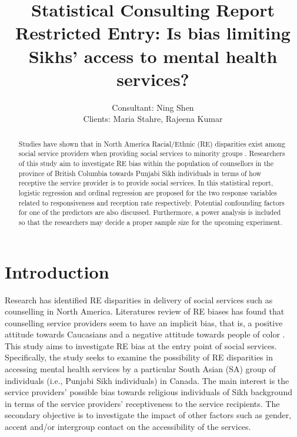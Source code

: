 \documentclass[11pt]{article}
\title{\textbf{Statistical Consulting Report} \\
\large Restricted Entry: Is bias limiting Sikhs’ access to mental health services?}
\author{Consultant: Ning Shen \\
Clients: Maria Stahre, Rajeena Kumar}
\date{}
\begin{document}
\maketitle

\begin{abstract}
    Studies have shown that in North America Racial/Ethnic (RE) disparities  exist among social service providers when providing social services to minority groups \citep*{Kugelmass2016,Shin2016}. Researchers of this  study aim to investigate  RE bias within the population of  counsellors in the province of British Columbia towards Punjabi Sikh individuals in terms of how receptive the service provider is to provide social services. In this statistical report, logistic regression and ordinal regression are proposed for the two response variables related to responsiveness and reception rate respectively. Potential confounding factors for one of the predictors are also discussed. Furthermore, a power analysis is included so that the researchers may decide a proper sample size for the upcoming experiment.
\end{abstract}


\section{Introduction}
Research has identified RE disparities in  delivery of social services such as  counselling in North America. Literatures review of RE biases has found that counselling service providers seem  to have an implicit bias, that is,  a positive attitude towards Caucasians and a negative attitude towards people of color \citep*{Kugelmass2016,Shin2016}. This  study aims to investigate RE bias at the entry point of social services. Specifically, the study seeks to examine the possibility of RE disparities in accessing mental health services  by a particular South Asian (SA) group of individuals (i.e., Punjabi Sikh individuals) in  Canada. The main interest  is  the service providers’ possible bias towards  religious individuals of Sikh background in terms of the service providers’ receptiveness to the service recipients.  The secondary objective is to investigate  the impact of other factors such as gender, accent and/or intergroup contact on the accessibility of the services.
\end{document}
